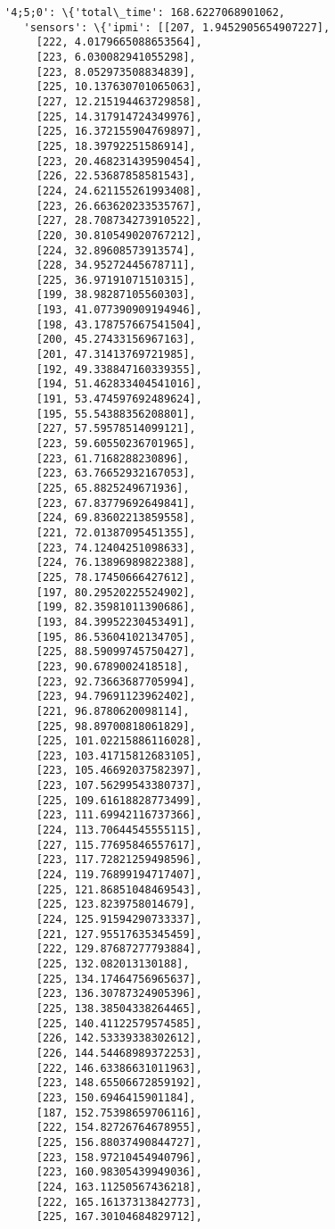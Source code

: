 \documentclass[11pt]{article}
\begin{document}
\begin{tcolorbox}[breakable, size=fbox, boxrule=.5pt, pad at break*=1mm, opacityfill=0]
\begin{Verbatim}[commandchars=\\\{\}]
  '4;5;0': \{'total\_time': 168.6227068901062,
   'sensors': \{'ipmi': [[207, 1.9452905654907227],
     [222, 4.0179665088653564],
     [223, 6.030082941055298],
     [223, 8.052973508834839],
     [225, 10.137630701065063],
     [227, 12.215194463729858],
     [225, 14.317914724349976],
     [225, 16.372155904769897],
     [225, 18.39792251586914],
     [223, 20.468231439590454],
     [226, 22.53687858581543],
     [224, 24.621155261993408],
     [223, 26.663620233535767],
     [227, 28.708734273910522],
     [220, 30.810549020767212],
     [224, 32.89608573913574],
     [228, 34.95272445678711],
     [225, 36.97191071510315],
     [199, 38.98287105560303],
     [193, 41.077390909194946],
     [198, 43.178757667541504],
     [200, 45.27433156967163],
     [201, 47.31413769721985],
     [192, 49.338847160339355],
     [194, 51.462833404541016],
     [191, 53.474597692489624],
     [195, 55.54388356208801],
     [227, 57.59578514099121],
     [223, 59.60550236701965],
     [223, 61.7168288230896],
     [223, 63.76652932167053],
     [225, 65.8825249671936],
     [223, 67.83779692649841],
     [224, 69.83602213859558],
     [221, 72.01387095451355],
     [223, 74.12404251098633],
     [224, 76.13896989822388],
     [225, 78.17450666427612],
     [197, 80.29520225524902],
     [199, 82.35981011390686],
     [193, 84.39952230453491],
     [195, 86.53604102134705],
     [225, 88.59099745750427],
     [223, 90.6789002418518],
     [223, 92.73663687705994],
     [223, 94.79691123962402],
     [221, 96.8780620098114],
     [225, 98.89700818061829],
     [225, 101.02215886116028],
     [223, 103.41715812683105],
     [223, 105.46692037582397],
     [223, 107.56299543380737],
     [225, 109.61618828773499],
     [223, 111.69942116737366],
     [224, 113.70644545555115],
     [227, 115.77695846557617],
     [223, 117.72821259498596],
     [224, 119.76899194717407],
     [225, 121.86851048469543],
     [225, 123.8239758014679],
     [224, 125.91594290733337],
     [221, 127.95517635345459],
     [222, 129.87687277793884],
     [225, 132.082013130188],
     [225, 134.17464756965637],
     [223, 136.30787324905396],
     [225, 138.38504338264465],
     [225, 140.41122579574585],
     [226, 142.53339338302612],
     [226, 144.54468989372253],
     [222, 146.63386631011963],
     [223, 148.65506672859192],
     [223, 150.6946415901184],
     [187, 152.75398659706116],
     [222, 154.82726764678955],
     [225, 156.88037490844727],
     [223, 158.97210454940796],
     [223, 160.98305439949036],
     [224, 163.11250567436218],
     [222, 165.16137313842773],
     [225, 167.30104684829712],

\end{Verbatim}
\end{tcolorbox}
\end{document}
